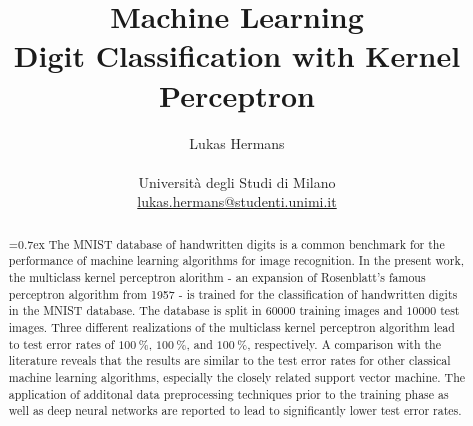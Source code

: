 \title{\large Machine Learning \\ \LARGE
 Digit Classification with Kernel Perceptron}
\author{Lukas Hermans\\ \\
{Università degli Studi di Milano} \\
\href{mailto:lukas.hermans@studenti.unimi.it}
{lukas.hermans@studenti.unimi.it}}

\maketitle

\begin{abstract} 
\noindent
{}\font=0.7ex%
The MNIST database of handwritten digits is a common benchmark for the performance of machine learning algorithms for image recognition. In the present work, the multiclass kernel perceptron alorithm - an expansion of Rosenblatt's famous perceptron algorithm from 1957 - is trained for the classification of handwritten digits in the MNIST database. The database is split in $60000$ training images and $10000$ test images. Three different realizations of the multiclass kernel perceptron algorithm lead to test error rates of $\SI{100}{\percent}$, $\SI{100}{\percent}$, and $\SI{100}{\percent}$, respectively. A comparison with the literature reveals that the results are similar to the test error rates for other classical machine learning algorithms, especially the closely related support vector machine. The application of additonal data preprocessing techniques prior to the training phase as well as deep neural networks are reported to lead to significantly lower test error rates. 
\end{abstract}
